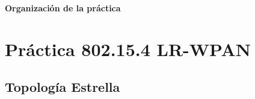 \documentclass[aspectratio=169, handout]{beamer}
\begin{document}

\begin{frame}{\textbf{Organización de la práctica}}
  \tableofcontents
\end{frame}
%
%

%
\section{Práctica 802.15.4 LR-WPAN}

\subsection[Estrella]{Topología Estrella}
\end{document}
